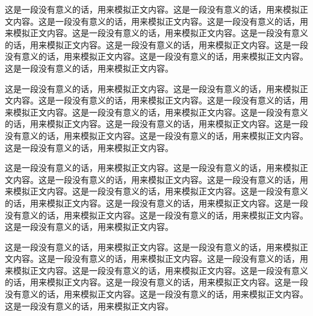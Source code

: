 
这是一段没有意义的话，用来模拟正文内容。这是一段没有意义的话，用来模拟正文内容。这是一段没有意义的话，用来模拟正文内容。这是一段没有意义的话，用来模拟正文内容。这是一段没有意义的话，用来模拟正文内容。这是一段没有意义的话，用来模拟正文内容。这是一段没有意义的话，用来模拟正文内容。这是一段没有意义的话，用来模拟正文内容。这是一段没有意义的话，用来模拟正文内容。这是一段没有意义的话，用来模拟正文内容。


这是一段没有意义的话，用来模拟正文内容。这是一段没有意义的话，用来模拟正文内容。这是一段没有意义的话，用来模拟正文内容。这是一段没有意义的话，用来模拟正文内容。这是一段没有意义的话，用来模拟正文内容。这是一段没有意义的话，用来模拟正文内容。这是一段没有意义的话，用来模拟正文内容。这是一段没有意义的话，用来模拟正文内容。这是一段没有意义的话，用来模拟正文内容。这是一段没有意义的话，用来模拟正文内容。


这是一段没有意义的话，用来模拟正文内容。这是一段没有意义的话，用来模拟正文内容。这是一段没有意义的话，用来模拟正文内容。这是一段没有意义的话，用来模拟正文内容。这是一段没有意义的话，用来模拟正文内容。这是一段没有意义的话，用来模拟正文内容。这是一段没有意义的话，用来模拟正文内容。这是一段没有意义的话，用来模拟正文内容。这是一段没有意义的话，用来模拟正文内容。这是一段没有意义的话，用来模拟正文内容。


这是一段没有意义的话，用来模拟正文内容。这是一段没有意义的话，用来模拟正文内容。这是一段没有意义的话，用来模拟正文内容。这是一段没有意义的话，用来模拟正文内容。这是一段没有意义的话，用来模拟正文内容。这是一段没有意义的话，用来模拟正文内容。这是一段没有意义的话，用来模拟正文内容。这是一段没有意义的话，用来模拟正文内容。这是一段没有意义的话，用来模拟正文内容。这是一段没有意义的话，用来模拟正文内容。
